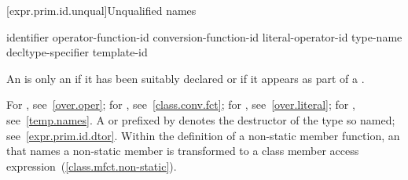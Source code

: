 [expr.prim.id.unqual]{Unqualified names}

\begin{bnf}
\br
    identifier\br
    operator-function-id\br
    conversion-function-id\br
    literal-operator-id\br
    \terminal{\~} type-name\br
    \terminal{\~} decltype-specifier\br
    template-id
\end{bnf}

\pnum
{}%
An  is only
an  if it has
been suitably declared
or if it appears as part of a .
\begin{note}
For , see~\ref{over.oper}; for
, see~\ref{class.conv.fct}; for
, see~\ref{over.literal}; for
, see~\ref{temp.names}.
A  or 
prefixed by \tcode{\~} denotes the destructor of the type so named;
see~\ref{expr.prim.id.dtor}.
Within the definition of a non-static member function, an
 that names a non-static member is transformed to a
class member access expression~(\ref{class.mfct.non-static}).
\end{note}

